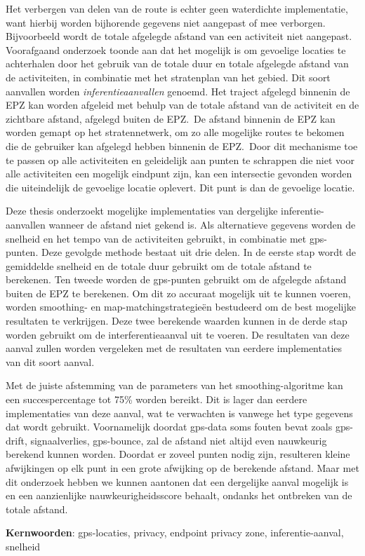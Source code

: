 Het verbergen van delen van de route is echter geen waterdichte implementatie,
want hierbij worden bijhorende gegevens niet aangepast of mee verborgen.
Bijvoorbeeld wordt de totale afgelegde afstand van een activiteit niet
aangepast. Voorafgaand onderzoek toonde aan dat het mogelijk is om gevoelige
locaties te achterhalen door het gebruik van de totale duur en totale afgelegde
afstand van de activiteiten, in combinatie met het stratenplan van het gebied.
Dit soort aanvallen worden \textit{inferentieaanvallen} genoemd. Het traject
afgelegd binnenin de EPZ kan worden afgeleid met behulp van de totale afstand
van de activiteit en de zichtbare afstand, afgelegd buiten de EPZ.\ De afstand
binnenin de EPZ kan worden gemapt op het stratennetwerk, om zo alle mogelijke
routes te bekomen die de gebruiker kan afgelegd hebben binnenin de EPZ.\ Door
dit mechanisme toe te passen op alle activiteiten en geleidelijk aan punten te
schrappen die niet voor alle activiteiten een mogelijk eindpunt zijn, kan een
intersectie gevonden worden die uiteindelijk de gevoelige locatie oplevert. Dit
punt is dan de gevoelige locatie.

Deze thesis onderzoekt mogelijke implementaties van dergelijke
inferentie-aanvallen wanneer de afstand niet gekend is. Als alternatieve
gegevens worden de snelheid en het tempo van de activiteiten gebruikt, in
combinatie met gps-punten. Deze gevolgde methode bestaat uit drie delen. In de
eerste stap wordt de gemiddelde snelheid en de totale duur gebruikt om de
totale afstand te berekenen. Ten tweede worden de gps-punten gebruikt om de
afgelegde afstand buiten de EPZ te berekenen. Om dit zo accuraat mogelijk uit
te kunnen voeren, worden smoothing- en map-matchingstrategieën bestudeerd om de
best mogelijke resultaten te verkrijgen. Deze twee berekende waarden kunnen in
de derde stap worden gebruikt om de interferentieaanval uit te voeren. De
resultaten van deze aanval zullen worden vergeleken met de resultaten van
eerdere implementaties van dit soort aanval.

Met de juiste afstemming van de parameters van het smoothing-algoritme kan een
succespercentage tot 75\% worden bereikt. Dit is lager dan eerdere
implementaties van deze aanval, wat te verwachten is vanwege het type gegevens
dat wordt gebruikt. Voornamelijk doordat gps-data soms fouten bevat zoals
gps-drift, signaalverlies, gps-bounce, zal de afstand niet altijd even
nauwkeurig berekend kunnen worden. Doordat er zoveel punten nodig zijn,
resulteren kleine afwijkingen op elk punt in een grote afwijking op de
berekende afstand. Maar met dit onderzoek hebben we kunnen aantonen dat een
dergelijke aanval mogelijk is en een aanzienlijke nauwkeurigheidsscore behaalt,
ondanks het ontbreken van de totale afstand.

\textbf{Kernwoorden}: gps-locaties, privacy, endpoint privacy zone,
inferentie-aanval, snelheid